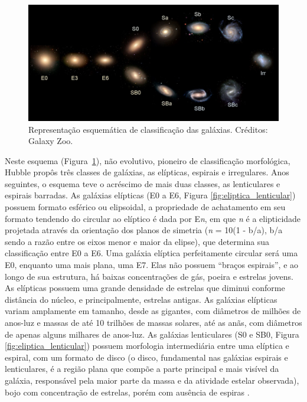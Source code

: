 \begin{figure} 
  \centering 
  \includegraphics[width=1.0\textwidth]{Imagens/HubbleTuningFork.jpg} 
  \caption[Esquema de Hubble de classificação de galáxias.]{Representação esquemática de classificação das galáxias. Créditos: Galaxy Zoo.} 
  \label{fig:esquema_hubble} 
\end{figure}

Neste esquema (Figura~\ref{fig:esquema_hubble}), não evolutivo, pioneiro de classificação morfológica, Hubble propôs três classes de galáxias, as elípticas, espirais e irregulares. Anos seguintes, o esquema teve o acréscimo de mais duas classes, as lenticulares e espirais barradas. As galáxias elípticas (E0 a E6, Figura \ref{fig:eliptica_lenticular}) possuem formato esférico ou elipsoidal, a propriedade de achatamento em seu formato tendendo do circular ao elíptico é dada por E\emph{n}, em que \emph{n} é a elipticidade projetada através da orientação dos planos de simetria (\emph{n} = 10(1 - b/a), b/a sendo a razão entre os eixos menor e maior da elipse), que determina sua classificação entre E0 a E6. Uma galáxia elíptica perfeitamente circular será uma E0, enquanto uma mais plana, uma E7. Elas não possuem ``braços espirais'', e ao longo de sua estrutura, há baixas concentrações de gás, poeira e estrelas jovens. As elípticas possuem uma grande densidade de estrelas que diminui conforme distância do núcleo, e principalmente, estrelas antigas. As galáxias elípticas variam amplamente em tamanho, desde as gigantes, com diâmetros de milhões de anos-luz e massas de até 10 trilhões de massas solares, até as anãs, com diâmetros de apenas alguns milhares de anos-luz. As galáxias lenticulares (S0 e SB0, Figura \ref{fig:eliptica_lenticular}) possuem morfologia intermediária entre uma elíptica e espiral, com um formato de disco (o disco, fundamental nas galáxias espirais e lenticulares, é a região plana que compõe a parte principal e mais visível da galáxia, responsável pela maior parte da massa e da atividade estelar observada), bojo com concentração de estrelas, porém com ausência de espiras \cite{2018sm,2022gastao,2023Kepler}.

